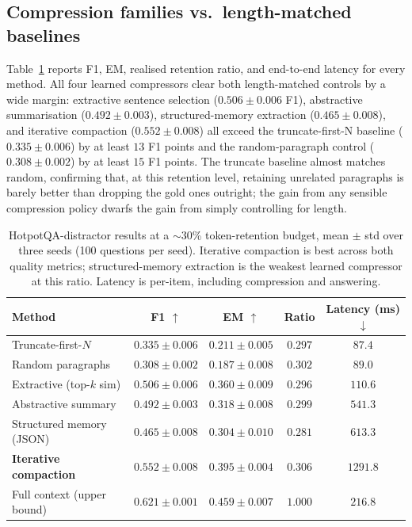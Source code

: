 \documentclass[10pt,twocolumn]{article}
\begin{document}
\subsection{Compression families vs.\ length-matched baselines}
Table~\ref{tab:main_compression} reports F1, EM, realised retention ratio, and end-to-end latency for every method. All four learned compressors clear both length-matched controls by a wide margin: extractive sentence selection ($0.506 \pm 0.006$ F1), abstractive summarisation ($0.492 \pm 0.003$), structured-memory extraction ($0.465 \pm 0.008$), and iterative compaction ($0.552 \pm 0.008$) all exceed the truncate-first-N baseline ($0.335 \pm 0.006$) by at least $13$ F1 points and the random-paragraph control ($0.308 \pm 0.002$) by at least $15$ F1 points. The truncate baseline almost matches random, confirming that, at this retention level, retaining unrelated paragraphs is barely better than dropping the gold ones outright; the gain from any sensible compression policy dwarfs the gain from simply controlling for length.

\begin{table}[!t]
\centering
\small
\begin{tabular}{lcccc}
\toprule
Method & F1 $\uparrow$ & EM $\uparrow$ & Ratio & Latency (ms) $\downarrow$ \\
\midrule
Truncate-first-$N$        & $0.335 \pm 0.006$ & $0.211 \pm 0.005$ & $0.297$ & $87.4$ \\
Random paragraphs         & $0.308 \pm 0.002$ & $0.187 \pm 0.008$ & $0.302$ & $89.0$ \\
Extractive (top-$k$ sim)  & $0.506 \pm 0.006$ & $0.360 \pm 0.009$ & $0.296$ & $110.6$ \\
Abstractive summary       & $0.492 \pm 0.003$ & $0.318 \pm 0.008$ & $0.299$ & $541.3$ \\
Structured memory (JSON)  & $0.465 \pm 0.008$ & $0.304 \pm 0.010$ & $0.281$ & $613.3$ \\
\textbf{Iterative compaction} & $\mathbf{0.552 \pm 0.008}$ & $\mathbf{0.395 \pm 0.004}$ & $0.306$ & $1291.8$ \\
\midrule
Full context (upper bound) & $0.621 \pm 0.001$ & $0.459 \pm 0.007$ & $1.000$ & $216.8$ \\
\bottomrule
\end{tabular}
\caption{HotpotQA-distractor results at a $\sim$30\% token-retention budget, mean $\pm$ std over three seeds (100 questions per seed). Iterative compaction is best across both quality metrics; structured-memory extraction is the weakest learned compressor at this ratio. Latency is per-item, including compression and answering.}
\label{tab:main_compression}
\end{table}
\end{document}
